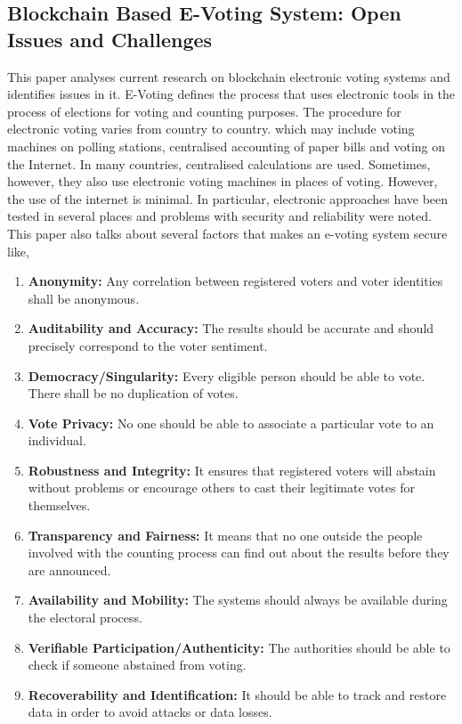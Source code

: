 \documentclass{IEEEtran}
\begin{document}
    \subsection{Blockchain Based E-Voting System: Open Issues and Challenges \cite{9670245}}
      This paper analyses current research on blockchain electronic voting systems and identifies issues in it. E-Voting defines the process that uses electronic tools in the process of elections for voting and counting purposes. The procedure for electronic voting varies from country to country. which may include voting machines on polling stations, centralised accounting of paper bills and voting on the Internet. In many countries, centralised calculations are used. Sometimes, however, they also use electronic voting machines in places of voting. However, the use of the internet is minimal. In particular, electronic approaches have been tested in several places and problems with security and reliability were noted. This paper also talks about several factors that makes an e-voting system secure like,
      \begin{enumerate}
        \item \textbf{Anonymity:} Any correlation between registered voters and voter identities shall be anonymous.
        \item \textbf{Auditability and Accuracy:} The results should be accurate and should precisely correspond to the voter sentiment.
        \item \textbf{Democracy/Singularity:} Every eligible person should be able to vote. There shall be no duplication of votes.
        \item \textbf{Vote Privacy:} No one should be able to associate a particular vote to an individual.
        \item \textbf{Robustness and Integrity:} It ensures that registered voters will abstain without problems or encourage others to cast their legitimate votes for themselves.
        \item \textbf{Transparency and Fairness:} It means that no one outside the people involved with the counting process can find out about the results before they are announced.
        \item \textbf{Availability and Mobility:} The systems should always be available during the electoral process.
        \item \textbf{Verifiable Participation/Authenticity:} The authorities should be able to check if someone abstained from voting.
        \item \textbf{Recoverability and Identification:} It should be able to track and restore data in order to avoid attacks or data losses.
      \end{enumerate}
\end{document}
